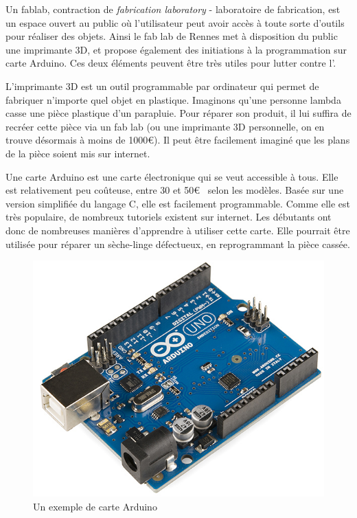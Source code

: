 Un fablab, contraction de \textit{fabrication laboratory} - laboratoire de fabrication, est un espace ouvert au public où l'utilisateur peut avoir accès à  toute sorte d'outils pour réaliser des objets. Ainsi le fab lab de Rennes met à disposition du public une imprimante 3D, et propose également des initiations à la programmation sur carte Arduino.
\smallbreak
Ces deux éléments peuvent être très utiles pour lutter contre l'\op. 

\bigbreak

L'imprimante 3D est un outil programmable par ordinateur qui permet de fabriquer n'importe quel objet en plastique. Imaginons qu'une personne lambda casse une pièce plastique d'un parapluie. Pour réparer son produit, il lui suffira de recréer cette pièce via un fab lab (ou une imprimante 3D personnelle, on en trouve désormais à moins de 1000\euro). Il peut être facilement imaginé que les plans de la pièce soient mis sur internet.

\bigbreak
Une carte Arduino est une carte électronique qui se veut accessible à tous. Elle est relativement peu coûteuse, entre 30 et 50\euro~ selon les modèles. Basée sur une version simplifiée du langage C, elle est facilement programmable. Comme elle est très populaire, de nombreux tutoriels existent sur internet. Les débutants ont donc de nombreuses manières d'apprendre à utiliser cette carte. Elle pourrait être utilisée pour réparer un sèche-linge défectueux, en reprogrammant la pièce cassée.

\begin{figure}
\begin{center}
\vspace{-1cm}\includegraphics[scale=0.25]{Rsc/Arduino.png} 

\caption{Un exemple de carte Arduino}
\end{center}
\end{figure}

